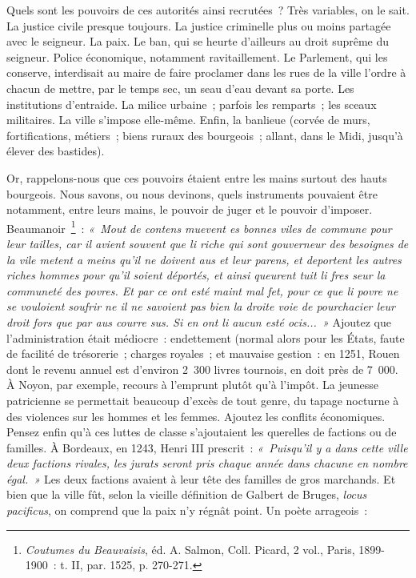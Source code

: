 \documentclass[french,twoside]{book} %
\begin{document}
Quels sont les pouvoirs de ces autorités ainsi recrutées ? Très variables, on le sait. La justice civile presque toujours. La justice criminelle plus ou moins partagée avec le seigneur. La paix. Le ban, qui se heurte d’ailleurs au droit suprême du seigneur. Police économique, notamment ravitaillement. Le Parlement, qui les conserve, interdisait au maire de faire proclamer dans les rues de la ville l’ordre à chacun de mettre, par le temps sec, un seau d’eau devant sa porte. Les institutions d’entraide. La milice urbaine ; parfois les remparts ; les sceaux militaires. La ville s’impose elle-même. Enfin, la banlieue (corvée de murs, fortifications, métiers ; biens ruraux des bourgeois ; allant, dans le Midi, jusqu’à élever des bastides).\par
Or, rappelons-nous que ces pouvoirs étaient entre les mains surtout des hauts bourgeois. Nous savons, ou nous devinons, quels instruments pouvaient être notamment, entre leurs mains, le pouvoir de juger et le pouvoir d’imposer. Beaumanoir \footnote{{\itshape Coutumes du Beauvaisis}, éd. A. Salmon, Coll. Picard, 2 vol., Paris, 1899-1900 : t. II, par. 1525, p. 270-271.} : \emph{« Mout de contens muevent es bonnes viles de commune pour leur tailles, car il avient souvent que li riche qui sont gouverneur des besoignes de la vile metent a meins qu’il ne doivent aus et leur parens, et  
\label{p77} deportent les autres riches hommes pour qu’il soient déportés, et ainsi queurent tuit li fres seur la communeté des povres. Et par ce ont esté maint mal fet, pour ce que li povre ne se vouloient soufrir ne il ne savoient pas bien la droite voie de pourchacier leur droit fors que par aus courre sus. Si en ont li aucun esté ocis... »} Ajoutez que l’administration était médiocre : endettement (normal alors pour les États, faute de facilité de trésorerie ; charges royales ; et mauvaise gestion : en 1251, Rouen dont le revenu annuel est d’environ 2 300 livres tournois, en doit près de 7 000. À Noyon, par exemple, recours à l’emprunt plutôt qu’à l’impôt. La jeunesse patricienne se permettait beaucoup d’excès de tout genre, du tapage nocturne à des violences sur les hommes et les femmes. Ajoutez les conflits économiques. Pensez enfin qu’à ces luttes de classe s’ajoutaient les querelles de factions ou de familles. À Bordeaux, en 1243, Henri III prescrit : \emph{« Puisqu’il y a dans cette ville deux factions rivales, les jurats seront pris chaque année dans chacune en nombre égal. »} Les deux factions avaient à leur tête des familles de gros marchands. Et bien que la ville fût, selon la vieille définition de Galbert de Bruges, \emph{locus pacificus}, on comprend que la paix n’y régnât point. Un poète arrageois :\par
\end{document}
